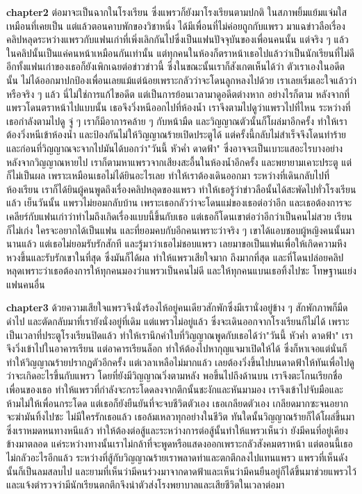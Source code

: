 \textbf{chapter2}
ต่อมาจะเป็นฉากในโรงเรียน ซึ่งแพรวก็ยังมาโรงเรียนตามปกติ ในสภาพยิ้มแย้มแจ่มใสเหมือนที่เคยเป็น แต่แล้วตอนคาบพักของวิชาหนึ่ง ได้มีเพื่อนที่ไม่ค่อยถูกกับแพรว มาแฉข่าวลือเรื่องคลิปหลุดระหว่างแพรวกับแฟนเก่าที่เพิ่งเลิกกันไปซึ่งเป็นแฟนปัจจุบันของเพื่อนคนนั้น แต่จริง ๆ แล้วในคลิปนั้นเป็นแค่คนหน้าเหมือนกันเท่านั้น แต่ทุกคนในห้องก็ตราหน้าเธอไปแล้วว่าเป็นนักเรียนที่ไม่ดี อีกทั้งแฟนเก่าของเธอก็ยังเพิกเฉยต่อข่าวข่าวนี้ ซึ่งในขณะนั้นเราก็สังเกตเห็นได้ว่า ตัวเราเองในอดีตนั้น ไม่ได้ออกมาปกป้องเพื่อนเลยแม้แต่น้อยเพราะกลัวว่าจะโดนลูกหลงไปด้วย เราเลยเริ่มเอะใจแล้วว่า หรือจริง ๆ แล้ว นี่ไม่ใช่การแก้ไขอดีต แต่เป็นการย้อนเวลามาดูอดีตต่างหาก อย่างไรก็ตาม หลังจากที่แพรวโดนตราหน้าไปแบบนั้น เธอจึงวิ่งหนีออกไปที่ห้องน้ำ เราจึงตามไปดูว่าแพรวไปที่ไหน ระหว่างที่เธอกำลังตามไปดู จู่ ๆ เราก็มีอาการคล้าย ๆ กับหน้ามืด และวิญญาณตัวนั้นก็โผล่มาอีกครั้ง ทำให้เราต้องวิ่งหนีเข้าห้องน้ำ และป้องกันไม่ให้วิญญาณร้ายเปิดประตูได้ แต่ครั้งนี้กลับไม่สำเร็จจึงโดนทำร้าย และก่อนที่วิญญาณจะจากไปมันได้บอกว่า"วันนี้ หัวค่ำ ดาดฟ้า" ซึ่งอาจจะเป็นเบาะแสอะไรบางอย่าง หลังจากวิญญาณหายไป เราก็ตามหาแพรวจากเสียงสะอื้นในห้องน้ำอีกครั้ง และพยายามเคาะประตู แต่ก็ไม่เป็นผล เพราะเหมือนเธอไม่ได้ยินอะไรเลย ทำให้เราต้องเดินออกมา ระหว่างที่เดินกลับไปที่ห้องเรียน เราก็ได้ยินผู้คนพูดถึงเรื่องคลิปหลุดของแพรว ทำให้เธอรู้ว่าข่าวลือนั้นได้สะพัดไปทั่วโรงเรียนแล้ว
เย็นวันนั้น แพรวไม่ยอมกลับบ้าน เพราะเธอกลัวว่าจะโดนแม่ของเธอต่อว่าอีก และเธอต้องการจะเคลียร์กับแฟนเก่าว่าทำไมถึงเกิดเรื่องแบบนี้ขึ้นกับเธอ แต่เธอก็โดนเขาต่อว่าอีกว่าเป็นคนไม่สวย เรียนก็ไม่เก่ง ใครจะอยากได้เป็นแฟน และที่ยอมคบกับอีกคนเพราะว่าจริง ๆ เขาได้แอบชอบผู้หญิงคนนั้นมานานแล้ว แต่เธอไม่ยอมรับรักสักที และรู้มาว่าเธอไม่ชอบแพรว เลยมาขอเป็นแฟนเพื่อให้เกิดความหึงหวงขึ้นและรับรักเขาในที่สุด ซึ่งมันก็ได้ผล ทำให้แพรวเสียใจมาก ถึงมากที่สุด และที่โดนปล่อยคลิปหลุดเพราะว่าเธอต้องการให้ทุกคนมองว่าแพรวเป็นคนไม่ดี และให้ทุกคนแบนเธอทิ้งไปซะ โทษฐานแย่งแฟนคนอื่น

\textbf{chapter3}
ด้วยความเสียใจแพรวจึงนั่งร้องไห้อยู่คนเดียวสักพักซึ่งมีเรานั่งอยู่ข้าง ๆ สักพักภาพก็มืดดำไป และตัดกลับมาที่เรายังนั่งอยู่ที่เดิม แต่แพรวไม่อยู่แล้ว ซึ่งจะเดินออกจากโรงเรียนก็ไม่ได้ เพราะเป็นเวลาที่ประตูโรงเรียนปิดแล้ว ทำให้เรานึกคำใบที่วิญญาณพูดกับเธอได้ว่า"วันนี้ หัวค่ำ ดาดฟ้า" เราจึงวิ่งเข้าไปในอาคารเรียน แต่อาคารเรียนล็อก ทำให้ต้องไปหากุญแจมาเปิดให้ได้ ซึ่งก็หาเจอแต่นั่นก็ทำให้วิญญาณร้ายปรากฏตัวอีกครั้ง แต่เวลาเหลือไม่มากแล้ว เลยต้องวิ่งขึ้นไปบนดาดฟ้าให้ทันเพื่อไปดูว่าจะเกิดอะไรขึ้นกับแพรว โดยที่ยังมีวิญญาณวิ่งตามหลัง พอขึ้นไปถึงด้านบน เราจึงตะโกนเรียกชื่อเพื่อนของเธอ ทำให้แพรวที่กำลังจะกระโดดลงจากตึกนั้นชะงักและหันมามอง เราจึงเข้าไปจับมือและห้ามไม่ให้เพื่อนกระโดด แต่เธอก็ยังยืนยันที่จะจบชีวิตตัวเอง เธอเกลียดตัวเอง เกลียดมากซะจนอยากจะฆ่ามันทิ้งไปซะ ไม่มีใครรักเธอแล้ว เธอล้มเหลวทุกอย่างในชีวิต ทันใดนั้นวิญญาณร้ายก็ได้โผล่ขึ้นมา ซึ่งเราหมดหนทางหนีแล้ว ทำให้ต้องต่อสู้และระหว่างการต่อสู้นั้นทำให้แพรวเห็นว่า ยังมีคนที่อยู่เคียงข้างมาตลอด แค่ระหว่างทางนั้นเราไม่กล้าที่จะพูดหรือแสดงออกเพราะกลัวสังคมตราหน้า แต่ตอนนี้เธอไม่กลัวอะไรอีกแล้ว ระหว่างที่สู้กับวิญญาณร้ายเราพลาดท่าและตกตึกลงไปแทนแพรว แพรวที่เห็นดังนั้นก็เป็นลมสลบไป และยามที่เห็นว่ามีคนร่วงมาจากดาดฟ้าและเห็นว่ามีคนยืนอยู่ก็ได้ขึ้นมาช่วยแพรวไว้ และแจ้งตำรวจว่ามีนักเรียนตกตึกจึงนำตัวส่งโรงพยาบาลและเสียชีวิตในเวลาต่อมา

